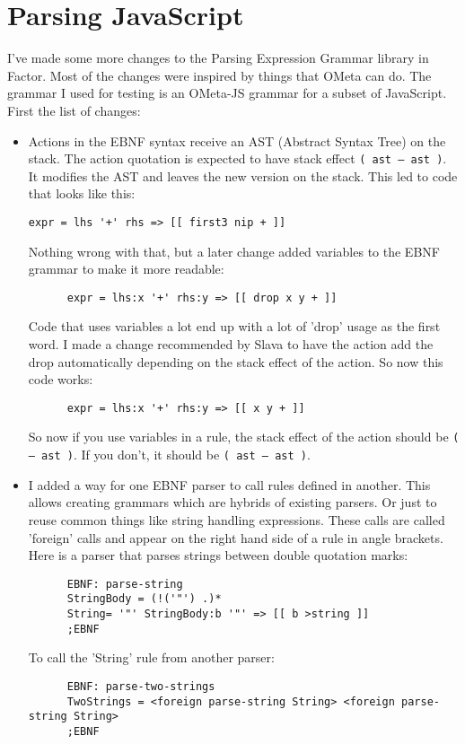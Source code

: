 \chapter{Parsing JavaScript}

I've made some more changes to the Parsing Expression Grammar library
in Factor. Most of the changes were inspired by things that OMeta can
do. The grammar I used for testing is an OMeta-JS grammar for a subset
of JavaScript. First the list of changes:

\begin{itemize}
\item Actions in the EBNF syntax receive an AST (Abstract Syntax Tree)
  on the stack. The action quotation is expected to have stack effect
  \texttt{( ast -- ast )}. It modifies the AST and leaves the new
  version on the stack. This led to code that looks like this:
\begin{verbatim}
expr = lhs '+' rhs => [[ first3 nip + ]]
\end{verbatim}

      Nothing wrong with that, but a later change added variables to
      the EBNF grammar to make it more readable:
\begin{verbatim}
      expr = lhs:x '+' rhs:y => [[ drop x y + ]]
\end{verbatim}

      Code that uses variables a lot end up with a lot of 'drop' usage
      as the first word. I made a change recommended by Slava to have
      the action add the drop automatically depending on the stack
      effect of the action. So now this code works:
\begin{verbatim}
      expr = lhs:x '+' rhs:y => [[ x y + ]]
\end{verbatim}

      So now if you use variables in a rule, the stack effect of the
      action should be \texttt{( -- ast )}. If you don't, it should be
      \texttt{( ast -- ast )}.  

\item I added a way for one EBNF parser to call rules defined in
  another. This allows creating grammars which are hybrids of existing
  parsers. Or just to reuse common things like string handling
  expressions. These calls are called 'foreign' calls and appear on
  the right hand side of a rule in angle brackets. Here is a parser
  that parses strings between double quotation marks:
\begin{verbatim}
      EBNF: parse-string
      StringBody = (!('"') .)* 
      String= '"' StringBody:b '"' => [[ b >string ]]
      ;EBNF
\end{verbatim}
      To call the 'String' rule from another parser:
\begin{verbatim}
      EBNF: parse-two-strings
      TwoStrings = <foreign parse-string String> <foreign parse-string String>
      ;EBNF
\end{verbatim}


\end{itemize}
